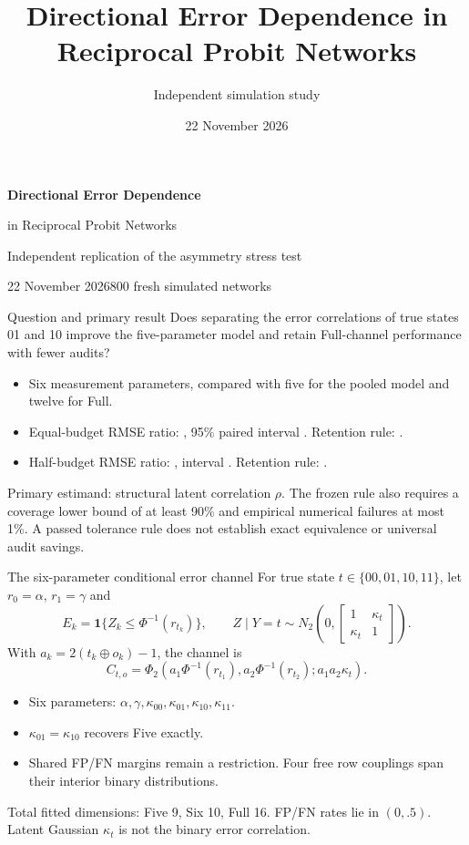 \documentclass[aspectratio=169,11pt]{beamer}
\title{Directional Error Dependence in Reciprocal Probit Networks}
\author{Independent simulation study}
\date{22 November 2026}
\newcommand{\source}[1]{\vfill{\scriptsize\color{graytext}#1}\par}
\begin{document}
\begin{frame}[plain]
\par\vspace{6mm}
{\LARGE\bfseries Directional Error Dependence\par in Reciprocal Probit Networks}\par\vspace{6mm}
{\large Independent replication of the asymmetry stress test}\par
\vfill\small 22 November 2026\hfill 800 fresh simulated networks
\end{frame}

\begin{frame}{Question and primary result}
Does separating the error correlations of true states 01 and 10 improve the five-parameter model and retain Full-channel performance with fewer audits?
\begin{itemize}
\item Six measurement parameters, compared with five for the pooled model and twelve for Full.
\item Equal-budget RMSE ratio: \textbf{\SameRatio}, 95\% paired interval \textbf{\SameCI}. Retention rule: \textbf{\SameResult}.
\item Half-budget RMSE ratio: \textbf{\HalfRatio}, interval \textbf{\HalfCI}. Retention rule: \textbf{\HalfResult}.
\end{itemize}
\source{Primary estimand: structural latent correlation $\rho$. The frozen rule also requires a coverage lower bound of at least 90\% and empirical numerical failures at most 1\%. A passed tolerance rule does not establish exact equivalence or universal audit savings.}
\end{frame}

\begin{frame}{The six-parameter conditional error channel}
For true state $t\in\{00,01,10,11\}$, let $r_0=\alpha$, $r_1=\gamma$ and
\[
E_k=\mathbf1\{Z_k\leq\Phi^{-1}(r_{t_k})\},\qquad
Z\mid Y=t\sim N_2\!\left(0,\begin{bmatrix}1&\kappa_t\\\kappa_t&1\end{bmatrix}\right).
\]
With $a_k=2(t_k\oplus o_k)-1$, the channel is
\[
C_{t,o}=\Phi_2\!\left(a_1\Phi^{-1}(r_{t_1}),a_2\Phi^{-1}(r_{t_2});a_1a_2\kappa_t\right).
\]
\begin{itemize}
\item Six parameters: $\alpha,\gamma,\kappa_{00},\kappa_{01},\kappa_{10},\kappa_{11}$.
\item $\kappa_{01}=\kappa_{10}$ recovers Five exactly.
\item Shared FP/FN margins remain a restriction. Four free row couplings span their interior binary distributions.
\end{itemize}
\source{Total fitted dimensions: Five 9, Six 10, Full 16. FP/FN rates lie in $(0,.5)$. Latent Gaussian $\kappa_t$ is not the binary error correlation.}
\end{frame}
\end{document}
